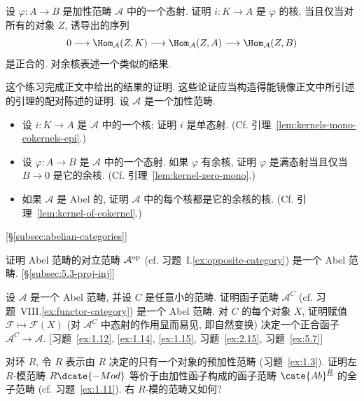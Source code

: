 \begin{prob}\label{ex:1.8}
设 $\varphi:A\to B$ 是加性范畴 $\mathcal{A}$ 中的一个态射. 证明 $i:K\to A$ 是 $\varphi$ 的核, 当且仅当对所有的对象 $Z$, 诱导出的序列
\[
0\longrightarrow\Hom_{\mathcal{A}}(Z,K)\longrightarrow\Hom_{\mathcal{A}}(Z,A)\longrightarrow\Hom_{\mathcal{A}}(Z,B)
\]
是正合的. 对余核表述一个类似的结果.
\end{prob}

\begin{prob}\label{ex:1.9}
这个练习完成正文中给出的结果的证明. 这些论证应当构造得能镜像正文中所引述的引理的配对陈述的证明.
设 $\mathcal{A}$ 是一个加性范畴.
\begin{itemize}
\item 设 $i:K\to A$ 是 $\mathcal{A}$ 中的一个核; 证明 $i$ 是单态射. (Cf. 引理~\ref{lem:kernels-mono-cokernels-epi}.)
\item 设 $\varphi:A\to B$ 是 $\mathcal{A}$ 中的一个态射. 如果 $\varphi$ 有余核, 证明 $\varphi$ 是满态射当且仅当 $B\to 0$ 是它的余核. (Cf. 引理~\ref{lem:kernel-zero-mono}.)
\item 如果 $\mathcal{A}$ 是 Abel 的, 证明 $\mathcal{A}$ 中的每个核都是它的余核的核. (Cf. 引理~\ref{lem:kernel-of-cokernel}.)
\end{itemize}
[\S\ref{subsec:abelian-categories}]
\end{prob}

\begin{prob}\label{ex:1.10}
证明 Abel 范畴的对立范畴 $\mathcal{A}^{\mathrm{op}}$ (cf. 习题~I.\ref{ex:opposite-category}) 是一个 Abel 范畴. [\S\ref{subsec:5.3-proj-inj}]
\end{prob}

\begin{prob}\label{ex:1.11}
设 $\mathcal{A}$ 是一个 Abel 范畴, 并设 $C$ 是任意小的范畴. 证明函子范畴 $\mathcal{A}^C$ (cf. 习题~VIII.\ref{ex:functor-category}) 是一个 Abel 范畴.
对 $C$ 的每个对象 $X$, 证明赋值 $\mathcal{F}\mapsto\mathcal{F}(X)$ (对 $\mathcal{A}^C$ 中态射的作用显而易见, 即自然变换) 决定一个正合函子 $\mathcal{A}^C\to\mathcal{A}$. [习题~\ref{ex:1.12}, \ref{ex:1.14}, \ref{ex:1.15}, 习题~\ref{ex:2.15}, 习题~\ref{ex:5.7}]
\end{prob}

\begin{prob}\label{ex:1.12}
对环 $R$, 令 $\underline{R}$ 表示由 $R$ 决定的只有一个对象的预加性范畴 (习题~\ref{ex:1.3}). 证明左 $R$-模范畴 $R\dcate{-Mod}$ 等价于由加性函子构成的函子范畴 $\cate{Ab}^{\underline{R}}$ 的全子范畴 (cf. 习题~\ref{ex:1.11}). 右 $R$-模的范畴又如何?
\end{prob}

